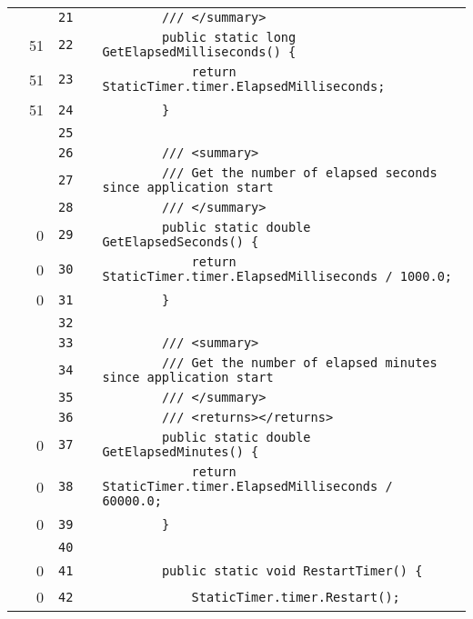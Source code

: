 \documentclass[a4paper,landscape,10pt]{article}
\begin{document}
\begin{longtable}[l]{lrrll}
\cellcolor{gray} &  & \verb~21~ & & \verb~        /// </summary>~\\
\cellcolor{green} & 51 & \verb~22~ & & \verb~        public static long GetElapsedMilliseconds() {~\\
\cellcolor{green} & 51 & \verb~23~ & & \verb~            return StaticTimer.timer.ElapsedMilliseconds;~\\
\cellcolor{green} & 51 & \verb~24~ & & \verb~        }~\\
\cellcolor{gray} &  & \verb~25~ & & \verb~~\\
\cellcolor{gray} &  & \verb~26~ & & \verb~        /// <summary>~\\
\cellcolor{gray} &  & \verb~27~ & & \verb~        /// Get the number of elapsed seconds since application start~\\
\cellcolor{gray} &  & \verb~28~ & & \verb~        /// </summary>~\\
\cellcolor{red} & 0 & \verb~29~ & & \verb~        public static double GetElapsedSeconds() {~\\
\cellcolor{red} & 0 & \verb~30~ & & \verb~            return StaticTimer.timer.ElapsedMilliseconds / 1000.0;~\\
\cellcolor{red} & 0 & \verb~31~ & & \verb~        }~\\
\cellcolor{gray} &  & \verb~32~ & & \verb~~\\
\cellcolor{gray} &  & \verb~33~ & & \verb~        /// <summary>~\\
\cellcolor{gray} &  & \verb~34~ & & \verb~        /// Get the number of elapsed minutes since application start~\\
\cellcolor{gray} &  & \verb~35~ & & \verb~        /// </summary>~\\
\cellcolor{gray} &  & \verb~36~ & & \verb~        /// <returns></returns>~\\
\cellcolor{red} & 0 & \verb~37~ & & \verb~        public static double GetElapsedMinutes() {~\\
\cellcolor{red} & 0 & \verb~38~ & & \verb~            return StaticTimer.timer.ElapsedMilliseconds / 60000.0;~\\
\cellcolor{red} & 0 & \verb~39~ & & \verb~        }~\\
\cellcolor{gray} &  & \verb~40~ & & \verb~~\\
\cellcolor{red} & 0 & \verb~41~ & & \verb~        public static void RestartTimer() {~\\
\cellcolor{red} & 0 & \verb~42~ & & \verb~            StaticTimer.timer.Restart();~\\

\end{longtable}
\end{document}
